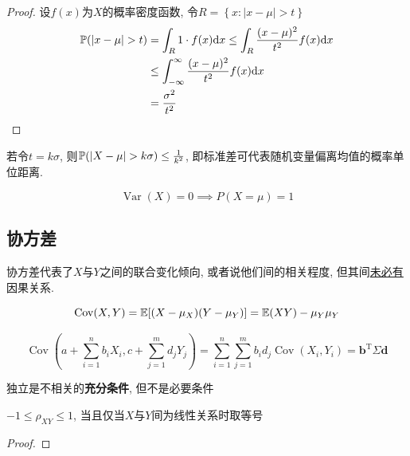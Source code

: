 \begin{proof}
    设$f(x)$为$X$的概率密度函数, 令$R=\left\{ x:|x-\mu|>t \right\} $
    \begin{align*}
        \P(|x-\mu|>t) & = \int_R 1 \cdot  f(x)\d x \le \int_R \frac{(x-\mu)^2}{t^{2}}f(x) \d x \\
                      & \le \int_{-\infty}^{\infty}\frac{(x-\mu)^2}{t^{2}}f(x) \d x            \\
                      & = \frac{\sigma^{2}}{t^{2}}
    \end{align*}
\end{proof}

\begin{remark}
    若令$t=k\sigma$, 则$\P(\left| X-\mu \right| >k\sigma)\le \frac{1}{k^{2}}$, 即标准差可代表随机变量偏离均值的概率单位距离.
\end{remark}

\begin{corollary}
    \[ \operatorname{Var}(X)=0 \implies P(X=\mu)=1 \]
\end{corollary}

\subsection{协方差}

协方差代表了$X$与$Y$之间的联合变化倾向, 或者说他们间的相关程度, 但其间\underline{未必有}因果关系.

\begin{theorem}
    \[ \operatorname{Cov} (X,Y)=\E[(X-\mu_X)(Y-\mu_Y)]=\E(XY)-\mu_Y \mu_Y \]
\end{theorem}

\begin{theorem}
    \[ \operatorname{Cov}(a+\sum_{i=1}^n b_i X_i,c+\sum_{j=1}^m d_j Y_j) = \sum_{i=1}^n\sum_{j=1}^m b_i d_j \operatorname{Cov}(X_i,Y_i) = \mathbf{b}^{\mathrm{T}}\Sigma \mathbf{d}\]
\end{theorem}

\begin{theorem}
    独立是不相关的\textbf{充分条件}, 但不是必要条件
\end{theorem}

\begin{theorem}
    $-1\le \rho_{XY} \le 1$, 当且仅当$X$与$Y$间为线性关系时取等号
\end{theorem}

\begin{proof}
\end{proof}

